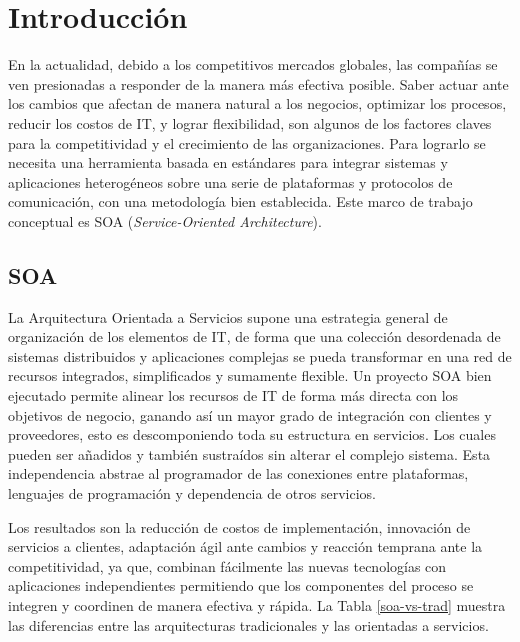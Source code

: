 \documentclass[conference]{IEEEtran}
\begin{document}
\section{Introducción}


En la actualidad, debido a los competitivos mercados globales, las
compañías se ven presionadas a responder de la manera más efectiva
posible. Saber actuar ante los cambios que afectan de manera natural a
los negocios, optimizar los procesos, reducir los costos de IT, y
lograr flexibilidad, son algunos de los factores claves para la
competitividad y el crecimiento de las organizaciones.
Para lograrlo se necesita una herramienta basada en estándares para
integrar sistemas y aplicaciones heterogéneos sobre una serie de
plataformas y protocolos de comunicación, con una metodología bien
establecida. Este marco de trabajo conceptual es SOA
(\textsl{Service-Oriented Architecture}).

\subsection{SOA}
\label{sec:intro-soa}

La Arquitectura Orientada a Servicios supone una estrategia general de
organización de los
elementos de IT, de forma que una colección desordenada de sistemas
distribuidos y aplicaciones complejas se pueda transformar en una red
de recursos integrados, simplificados y sumamente flexible. Un
proyecto SOA bien ejecutado permite alinear los recursos de IT de
forma más directa con los objetivos de negocio, ganando así un mayor
grado de integración con clientes y proveedores, esto es
descomponiendo toda su estructura en servicios. Los cuales pueden ser
añadidos y también sustraídos sin alterar el complejo sistema. Esta
independencia abstrae al programador de las conexiones entre
plataformas, lenguajes de programación y dependencia de otros
servicios.

Los resultados son la reducción de costos de implementación,
innovación de servicios a clientes, adaptación ágil ante cambios y
reacción temprana ante la competitividad, ya que, combinan fácilmente
las nuevas tecnologías con aplicaciones independientes permitiendo
que los componentes del proceso se integren y coordinen de manera
efectiva y rápida. La Tabla \ref{soa-vs-trad} muestra las diferencias
entre las arquitecturas tradicionales y las orientadas a servicios.
\end{document}
